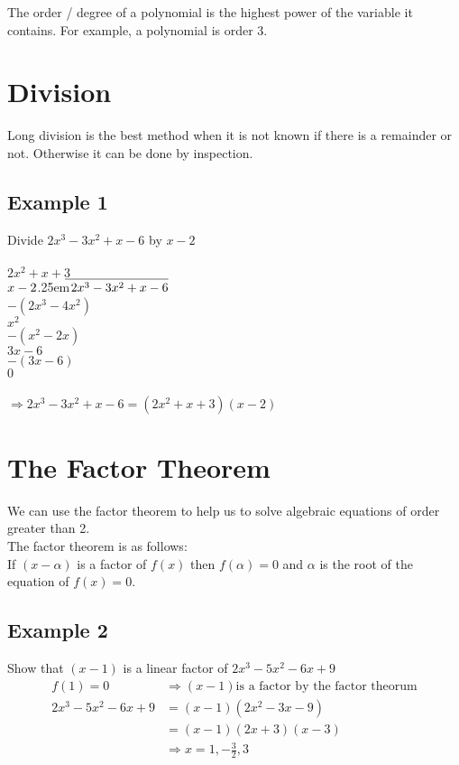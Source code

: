 \documentclass[class=article, crop=false]{standalone}
\begin{document}
\newcommand\longdiv[2]{%
$\strut#1$\kern.25em\smash{\raise.3ex\hbox{$\big)$}}$\mkern-8mu
        \overline{\enspace\strut#2}$}


The order / degree of a polynomial is the highest power of the variable it contains. For example, a polynomial is order 3. \\
\section*{Division}
Long division is the best method when it is not known if there is a remainder or not. Otherwise it can  be done by inspection. \\
\subsection*{Example 1}
Divide $2x^3 -3x^2 + x -6$ by $x-2$ \\\\
\phantom{A}\hspace{0.8cm} $2x^2 + x + 3$ \\
\longdiv{x-2}{2x^3 -3x^2 + x -6} \\
\phantom{A}\hspace{0.3cm} $-(2x^3 -4x^2)$ \\
\phantom{A}\hspace{2.1cm} $x^2$ \\
\phantom{A}\hspace{1.6cm} $-(x^2-2x)$ \\
\phantom{A}\hspace{3cm} $3x-6$ \\
\phantom{A}\hspace{2.5cm} $-(3x-6)$ \\
\phantom{A}\hspace{4cm} $0$ \\\\
$\Rightarrow 2x^3 -3x^2 + x -6 = (2x^2 + x + 3)(x-2)$
\section*{The Factor Theorem}
We can use the factor theorem to help us to solve algebraic equations of order greater than 2. \\
The factor theorem is as follows: \\
If $(x-\alpha)$ is a factor of $f(x)$ then $f(\alpha) = 0$ and $\alpha$ is the root of the equation of $f(x) = 0$. \\
\subsection*{Example 2}
Show that $(x-1)$ is a linear factor of $2x^3 - 5x^2 - 6x + 9$ \\ 
\begin{align*}
f(1) = 0 & \Rightarrow (x-1) \text{is a factor by the factor theorum} \\
2x^3 - 5x^2 - 6x + 9 & = (x-1)(2x^2-3x-9) \\
& = (x-1)(2x+3)(x-3) \\
& \Rightarrow x = 1, -\frac{3}{2}, 3 \\
\end{align*}
\end{document}
